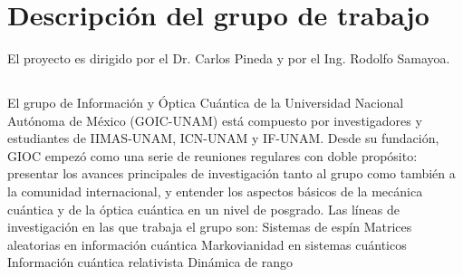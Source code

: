 \section{Descripción del grupo de trabajo}

El proyecto es dirigido por el Dr. Carlos Pineda y por el Ing. Rodolfo Samayoa.


\subsection{}


\subsection{}

El grupo de Información y Óptica Cuántica de la Universidad Nacional Autónoma de México (GOIC-UNAM)
está compuesto por investigadores y estudiantes de IIMAS-UNAM, ICN-UNAM y IF-UNAM.
Desde su fundación, GIOC empezó como una serie de reuniones regulares con doble propósito: presentar los
avances principales de investigación tanto al grupo como también a la comunidad internacional, y entender
los aspectos básicos de la mecánica cuántica y de la óptica cuántica en un nivel de posgrado.
Las líneas de investigación en las que trabaja el grupo son:
Sistemas de espín
Matrices aleatorias en información cuántica
Markovianidad en sistemas cuánticos
Información cuántica relativista
Dinámica de rango